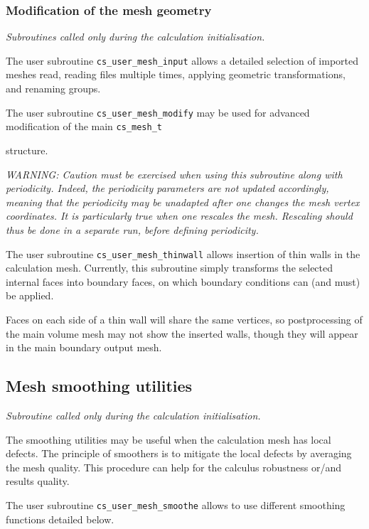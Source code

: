 {{{%
\subsubsection{Modification of the mesh geometry}
\noindent
\textit{Subroutines called only during the calculation initialisation.}

The user subroutine \texttt{cs\_user\_mesh\_input} allows a detailed
selection of imported meshes read, reading files multiple times,
applying geometric transformations, and renaming groups.

The user subroutine \texttt{cs\_user\_mesh\_modify} may be used
for advanced modification of the main \texttt{cs\_mesh\_t}} structure.

{\em WARNING: Caution must be exercised when using this subroutine
along with periodicity. Indeed, the periodicity parameters are not
updated accordingly, meaning that the periodicity may be unadapted
after one changes the mesh vertex coordinates. It is particularly
true when one rescales the mesh. Rescaling should thus be done
in a separate run, before defining periodicity.}

The user subroutine \texttt{cs\_user\_mesh\_thinwall} allows
insertion of thin walls in the calculation mesh. Currently, this
subroutine simply transforms the selected internal faces into boundary
faces, on which boundary conditions can (and must) be applied.

Faces on each side of a thin wall will share the same vertices,
so postprocessing of the main volume mesh may not show the
inserted walls, though they will appear in the main boundary
output mesh.

\subsection{Mesh smoothing utilities}
\noindent
\textit{Subroutine called only during the calculation initialisation.}

The smoothing utilities may be useful when the calculation mesh has local
defects. 
The principle of smoothers is to mitigate the local defects by averaging
the mesh quality. This procedure can help for the calculus robustness or/and 
results quality.

The user subroutine \texttt{cs\_user\_mesh\_smoothe} allows to use different
smoothing functions detailed below.

}}
